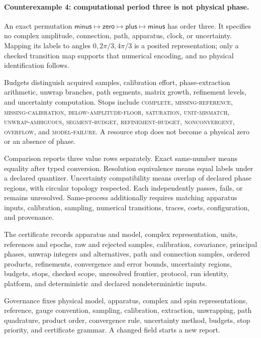 \paragraph{Counterexample 4: computational period three is not physical phase.}
An exact permutation
\(\mathsf{minus}\mapsto\mathsf{zero}\mapsto\mathsf{plus}\mapsto\mathsf{minus}\)
has order three.  It specifies no complex amplitude, connection, path, apparatus, clock, or uncertainty.  Mapping its
labels to angles \(0,2\pi/3,4\pi/3\) is a posited representation; only a checked transition map supports that
numerical encoding, and no physical identification follows.

Budgets distinguish acquired samples, calibration effort, phase-extraction arithmetic, unwrap branches, path
segments, matrix growth, refinement levels, and uncertainty computation.  Stops include \textsc{complete},
\textsc{missing-reference}, \textsc{missing-calibration}, \textsc{below-amplitude-floor}, \textsc{saturation},
\textsc{unit-mismatch}, \textsc{unwrap-ambiguous}, \textsc{segment-budget}, \textsc{refinement-budget},
\textsc{nonconvergent}, \textsc{overflow}, and \textsc{model-failure}.  A resource stop does not become a physical
zero or an absence of phase.

Comparison reports three value rows separately.  Exact same-number means equality after typed conversion.
Resolution equivalence means equal labels under a declared quantizer.  Uncertainty compatibility means overlap of
declared phase regions, with circular topology respected.  Each independently passes, fails, or remains unresolved.
Same-process additionally requires matching apparatus inputs, calibration, sampling, numerical transitions, traces,
costs, configuration, and provenance.

The certificate records apparatus and model, complex representation, units, references and epochs, raw and rejected
samples, calibration, covariance, principal phases, unwrap integers and alternatives, path and connection samples,
ordered products, refinements, convergence and error bounds, uncertainty regions, budgets, stops, checked scope,
unresolved frontier, protocol, run identity, platform, and deterministic and declared nondeterministic inputs.

Governance fixes physical model, apparatus, complex and spin representations, reference, gauge convention, sampling,
calibration, extraction, unwrapping, path quadrature, product order, convergence rule, uncertainty method, budgets,
stop priority, and certificate grammar.  A changed field starts a new report.

